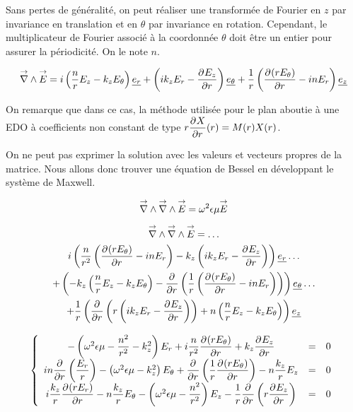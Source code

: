 Sans pertes de généralité, on peut réaliser une transformée de Fourier en $z$ par invariance en translation et en $\theta$ par invariance en rotation. Cependant, le multiplicateur de Fourier associé à la coordonnée $\theta$ doit être un entier pour assurer la périodicité. On le note $n$.

\begin{equation}
\vrot \vE = i\left(\frac{n}{r}E_z - k_zE_\theta\right)\v{e_r} + 
\left(ik_zE_r - \ddr{r}{E_z}\right)\v{e_\theta} +
\frac{1}{r}\left(\ddr{r}{(rE_\theta)}-inE_r\right)\v{e_z}
\end{equation}

On remarque que dans ce cas, la méthode utilisée pour le plan aboutie à une EDO à coefficients non constant de type $r\ddr{r}{X}(r) = M(r)X(r)$.

On ne peut pas exprimer la solution avec les valeurs et vecteurs propres de la matrice. Nous allons donc trouver une équation de Bessel en développant le système de Maxwell.

\begin{equation}
\vrot \vrot \vE = \w^2\eps\mu \vE
\end{equation}

\begin{multline}
\vrot \vrot \vE = \dots\\
i\left(\frac{n}{r^2}\left(\ddr{r}{(rE_\theta)} - inE_r\right) - k_z\left(ik_zE_r - \ddr{r}{E_z}\right)\right)    \v{e_r} \dots\\ 
+ \left(-k_z\left(\frac{n}{r}E_z - k_zE_\theta\right) -\ddr{r}{}\left(\frac{1}{r}\left(\ddr{r}{(rE_\theta)}-inE_r\right)\right)\right)    \v{e_\theta} \dots\\
+ \frac{1}{r}\left(\ddr{r}{} \left(r\left(ik_zE_r - \ddr{r}{E_z}\right)\right) + n \left(\frac{n}{r}E_z - k_zE_\theta\right)\right) \v{e_z}
\end{multline}

\begin{equation}
\left\lbrace
\begin{array}{ccc}
-\left(\w^2\eps\mu -\frac{n^2}{r^2}  - k_z^2\right)E_r  +i\frac{n}{r^2}\ddr{r}{(rE_\theta)}  +k_z\ddr{r}{E_z} & = & 0\\
in\ddr{r}{}\left(\frac{E_r}{r}\right) -\left(\w^2\eps\mu - k_z^2\right)E_\theta + \ddr{r}{}\left(\frac{1}{r}\ddr{r}{(rE_\theta)}\right)  - n\frac{k_z}{r}E_z & = & 0\\
i\frac{k_z}{r}\ddr{r}{(rE_r)}  - n\frac{k_z}{r}E_\theta  -\left(\w^2\eps\mu - \frac{n^2}{r^2} \right)E_z - \frac{1}{r}\ddr{r}{}\left(r\ddr{r}{E_z}\right) & = & 0
\end{array}
\right.
\end{equation}



